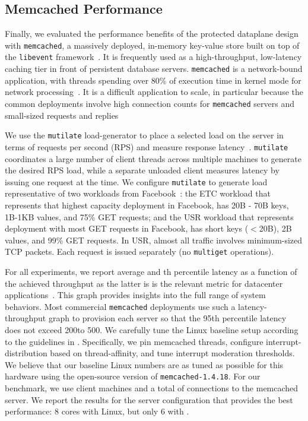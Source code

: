 
\subsection{Memcached Performance}
\label{sec:eval:memcached}




Finally, we evaluated the performance benefits of the \ix protected
dataplane design with \texttt{memcached}, a massively deployed,
in-memory key-value store built on top of the \texttt{libevent}
framework~\cite{url:memcached}. It is frequently used as a
high-throughput, low-latency caching tier in front of persistent
database servers. \texttt{memcached} is a network-bound application,
with threads spending over 80\% of execution time in kernel mode for
network processing~\cite{DBLP:conf/eurosys/LeverichK14}. It is a difficult
application to scale, in particular because the common deployments
involve high connection counts for \texttt{memcached} servers and
small-sized requests and
replies~\cite{DBLP:conf/nsdi/NishtalaFGKLLMPPSSTV13,Atikoglu:2012:WAL}

We use the \texttt{mutilate} load-generator to place a selected load
on the server in terms of requests per second (RPS) and measure
response latency~\cite{url:mutilate}. \texttt{mutilate} coordinates a
large number of client threads across multiple machines to generate
the desired RPS load, while a separate unloaded client measures
latency by issuing one request at the time.  We configure
\texttt{mutilate} to generate load representative of two workloads
from Facebook~\cite{Atikoglu:2012:WAL}: the ETC workload that
represents that highest capacity deployment in Facebook, has 20B - 70B
keys, 1B-1KB values, and 75\% GET requests; and the USR workload that
represents deployment with most GET requests in Facebook, has short
keys ($<$20B), 2B values, and 99\% GET requests. In USR, almost all
traffic involves minimum-sized TCP packets. Each request is issued
separately (no \texttt{multiget} operations).


For all experiments, we report average and th percentile latency as
a function of the achieved throughput as the latter is is the relevant metric
for datacenter applications~\cite{DBLP:journals/cacm/DeanB13}. This
graph provides insights into the full range of system behaviors. Most
commercial \texttt{memcached} deployments use such a
latency-throughput graph to provision each server so that the 95th 
percentile latency does not exceed 200\microsecond to 500\microsecond.
We carefully tune the Linux baseline setup according to the guidelines
in \cite{DBLP:conf/eurosys/LeverichK14}. Specifically, we pin memcached threads,
configure interrupt-distribution based on thread-affinity, and tune
interrupt moderation thresholds. We believe that our baseline Linux
numbers are as tuned as possible for this hardware using the
open-source version of \texttt{memcached-1.4.18}. For our benchmark,
we use  client machines and a total of  connections to the
memcached server.  We report the results for the server configuration
that provides the best performance: 8 cores with Linux, but only 6
with \ix.

